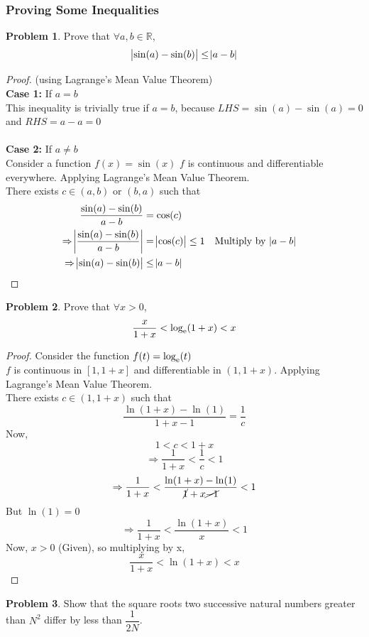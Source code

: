\documentclass[14]{article}
\theoremstyle{definition}
\newtheorem{prob}{Problem}
\theoremstyle{case}
\begin{document}
\subsubsection*{Proving Some Inequalities}
\begin{prob}
Prove that $\forall a, b \in \mathbb{R}$, 
\[\abs{\sin(a) - \sin(b)} \leq \abs{a - b}\]
\end{prob}
\begin{proof} (using Lagrange's Mean Value Theorem)\\
\textbf{Case 1:} If $a = b$\\
This inequality is trivially true if $a = b$, because $LHS = \sin(a) - \sin(a) = 0$ and $RHS = a - a = 0$\\\\
\textbf{Case 2:} If $a \neq b$\\
Consider a function $f(x) = \sin(x)$
$f$ is continuous and differentiable everywhere. Applying Lagrange's Mean Value Theorem.\\
There exists $c \in (a, b)$ or $(b, a)$ such that
\begin{align*}
\dfrac{\sin(a) - \sin(b)}{a - b} &= \cos(c)\\
\Rightarrow \abs{\dfrac{\sin(a) - \sin(b)}{a - b}} &= \abs{\cos(c)} \leq 1 && \text{Multiply by } \abs{a - b}\\
\Rightarrow \abs{\sin(a) - \sin(b)} &\leq \abs{a - b}
\end{align*}
\end{proof}
\begin{prob}
Prove that $\forall x > 0$,
\[\dfrac{x}{1+x} < \log_{\rm e}(1+x) < x\]
\end{prob}
\begin{proof}
Consider the function $f(t) = \log_{\rm e}(t)$\\
$f$ is continuous in $[1, 1+x]$ and differentiable in $(1, 1+x)$. Applying Lagrange's Mean Value Theorem.\\
There exists $c \in (1, 1 + x)$ such that
\[\dfrac{\ln(1 + x) - \ln(1)}{1 + x - 1} = \dfrac1{c}\]
Now,
\[1 < c < 1+x\]
\[\Rightarrow \dfrac1{1 + x} < \dfrac1{c} < 1\]
\[\Rightarrow \dfrac1{1 + x} < \dfrac{\ln(1 + x) - \ln(1)}{\cancel{1} + x \cancel{- 1}} < 1\]
But $\ln(1) = 0$
\[\Rightarrow \dfrac1{1 + x} < \dfrac{\ln(1 + x)}{x} < 1\]
Now, $x > 0$ (Given), so multiplying by x,
\[\dfrac{x}{1 + x} < \ln(1+x) < x\]
\end{proof}
\pagebreak
\begin{prob}
Show that the square roots two successive natural numbers greater than $N^2$ differ by less than $\dfrac1{2N}$.
\end{prob}
\end{document}
